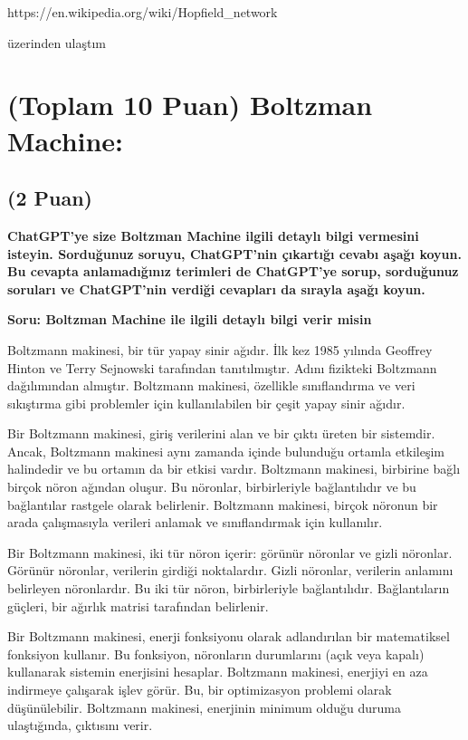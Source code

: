 \documentclass[11pt]{article}
\begin{document}
https://en.wikipedia.org/wiki/Hopfield\_network 

üzerinden ulaştım


\section{(Toplam 10 Puan) Boltzman Machine:}

\subsection{(2 Puan)} \textbf{ChatGPT’ye size Boltzman Machine ilgili detaylı bilgi vermesini isteyin. Sorduğunuz soruyu, ChatGPT'nin çıkartığı cevabı aşağı koyun. Bu cevapta anlamadığınız terimleri de ChatGPT’ye sorup, sorduğunuz soruları ve ChatGPT’nin verdiği cevapları da sırayla aşağı koyun.}

\textbf{Soru: Boltzman Machine ile ilgili detaylı bilgi verir misin}

Boltzmann makinesi, bir tür yapay sinir ağıdır. İlk kez 1985 yılında Geoffrey Hinton ve Terry Sejnowski tarafından tanıtılmıştır. Adını fizikteki Boltzmann dağılımından almıştır. Boltzmann makinesi, özellikle sınıflandırma ve veri sıkıştırma gibi problemler için kullanılabilen bir çeşit yapay sinir ağıdır.

Bir Boltzmann makinesi, giriş verilerini alan ve bir çıktı üreten bir sistemdir. Ancak, Boltzmann makinesi aynı zamanda içinde bulunduğu ortamla etkileşim halindedir ve bu ortamın da bir etkisi vardır. Boltzmann makinesi, birbirine bağlı birçok nöron ağından oluşur. Bu nöronlar, birbirleriyle bağlantılıdır ve bu bağlantılar rastgele olarak belirlenir. Boltzmann makinesi, birçok nöronun bir arada çalışmasıyla verileri anlamak ve sınıflandırmak için kullanılır.

Bir Boltzmann makinesi, iki tür nöron içerir: görünür nöronlar ve gizli nöronlar. Görünür nöronlar, verilerin girdiği noktalardır. Gizli nöronlar, verilerin anlamını belirleyen nöronlardır. Bu iki tür nöron, birbirleriyle bağlantılıdır. Bağlantıların güçleri, bir ağırlık matrisi tarafından belirlenir.

Bir Boltzmann makinesi, enerji fonksiyonu olarak adlandırılan bir matematiksel fonksiyon kullanır. Bu fonksiyon, nöronların durumlarını (açık veya kapalı) kullanarak sistemin enerjisini hesaplar. Boltzmann makinesi, enerjiyi en aza indirmeye çalışarak işlev görür. Bu, bir optimizasyon problemi olarak düşünülebilir. Boltzmann makinesi, enerjinin minimum olduğu duruma ulaştığında, çıktısını verir.
\end{document}
